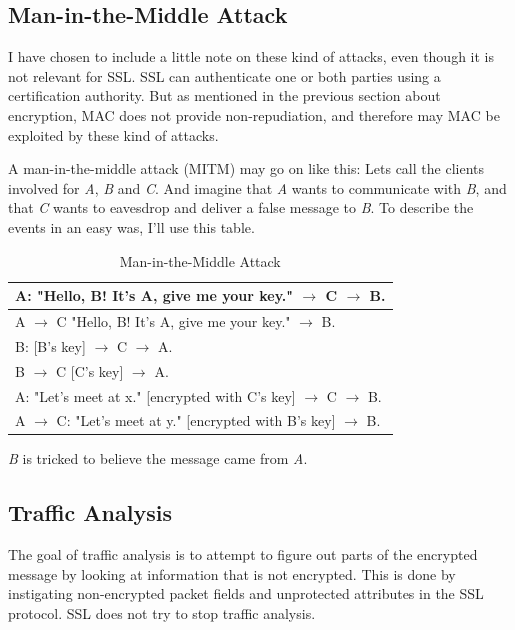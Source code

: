 \documentclass[11pt,a4paper, twocolumn]{article}
\begin{document}
\subsection{Man-in-the-Middle Attack}
I have chosen to include a little note on these kind of attacks, even though it is not relevant for SSL. SSL can authenticate one or both parties using a certification authority. But as mentioned in the previous section about encryption, MAC does not provide non-repudiation, and therefore may MAC be exploited by these kind of attacks.

A man-in-the-middle attack (MITM) may go on like this:
Lets call the clients involved for \textit{A}, \textit{B} and \textit{C}. And imagine that \textit{A} wants to communicate with \textit{B}, and that \textit{C} wants to eavesdrop and deliver a false message to \textit{B}. To describe the events in an easy was, I'll use this table.

\begin{table}[h!]
\begin{center}
\begin{tabular}{| p{7.4cm} |}
\hline
A: "Hello, B! It's A, give me your key." $\rightarrow$ C $\rightarrow$ B.  \\
\hline
A $\rightarrow$ C "Hello, B! It's A, give me your key." $\rightarrow$ B. \\
\hline
B: [B's key] $\rightarrow$ C $\rightarrow$ A. \\
\hline
B $\rightarrow$ C [C's key] $\rightarrow$ A. \\
\hline
A: "Let's meet at x." [encrypted with C's key] $\rightarrow$ C  $\rightarrow$ B. \\
\hline
A  $\rightarrow$ C: "Let's meet at y." [encrypted with B's key]  $\rightarrow$ B.\\
\hline
\end{tabular}
\end{center}
\caption{Man-in-the-Middle Attack}
\label{MITM}
\end{table}

\textit{B} is tricked to believe the message came from \textit{A}.

\subsection{Traffic Analysis}
The goal of traffic analysis is to attempt to figure out parts of the encrypted message by looking at information that is not encrypted. This is done by instigating non-encrypted packet fields and unprotected attributes in the SSL protocol. SSL does not try to stop traffic analysis. 
\end{document}
